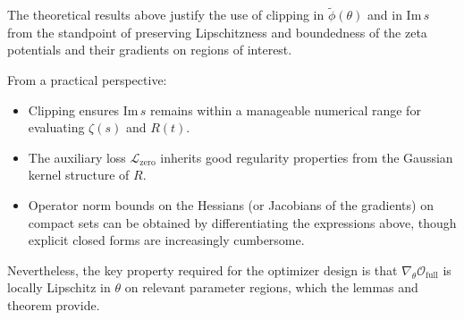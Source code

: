 \documentclass[11pt]{article}
\begin{document}
The theoretical results above justify the use of clipping in $\tilde{\phi}(\theta)$ and in $\mathrm{Im}\,s$ from the standpoint of preserving Lipschitzness and boundedness of the zeta potentials and their gradients on regions of interest.

From a practical perspective:
\begin{itemize}[leftmargin=*]
  \item Clipping ensures $\mathrm{Im}\,s$ remains within a manageable numerical range for evaluating $\zeta(s)$ and $R(t)$.
  \item The auxiliary loss $\mathcal{L}_{\mathrm{zero}}$ inherits good regularity properties from the Gaussian kernel structure of $R$.
  \item Operator norm bounds on the Hessians (or Jacobians of the gradients) on compact sets can be obtained by differentiating the expressions above, though explicit closed forms are increasingly cumbersome.
\end{itemize}

Nevertheless, the key property required for the optimizer design is that $\nabla_\theta\mathcal{O}_{\mathrm{full}}$ is locally Lipschitz in $\theta$ on relevant parameter regions, which the lemmas and theorem provide.

\nocite{*}
  
  
\end{document}
